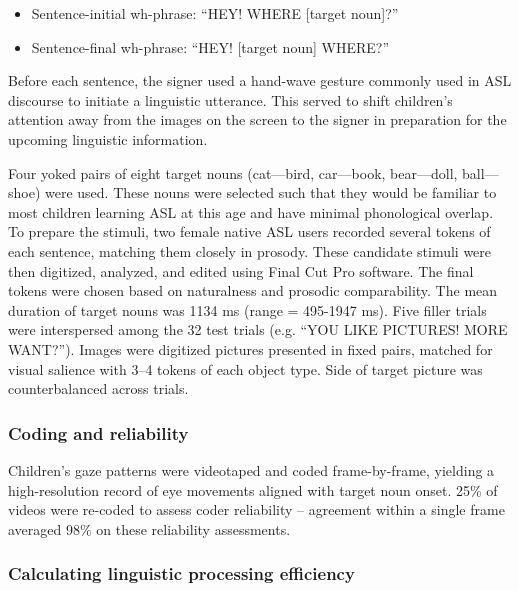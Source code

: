 \documentclass[12pt,]{article}
\begin{document}
\begin{itemize}
\itemsep1pt\parskip0pt
\item
  Sentence-initial wh-phrase: ``HEY! WHERE {[}target noun{]}?''
\item
  Sentence-final wh-phrase: ``HEY! {[}target noun{]} WHERE?''
\end{itemize}

Before each sentence, the signer used a hand-wave gesture commonly used
in ASL discourse to initiate a linguistic utterance. This served to
shift children's attention away from the images on the screen to the
signer in preparation for the upcoming linguistic information.

Four yoked pairs of eight target nouns (cat---bird, car---book,
bear---doll, ball---shoe) were used. These nouns were selected such that
they would be familiar to most children learning ASL at this age and
have minimal phonological overlap. To prepare the stimuli, two female
native ASL users recorded several tokens of each sentence, matching them
closely in prosody. These candidate stimuli were then digitized,
analyzed, and edited using Final Cut Pro software. The final tokens were
chosen based on naturalness and prosodic comparability. The mean
duration of target nouns was 1134 ms (range = 495-1947 ms). Five filler
trials were interspersed among the 32 test trials (e.g. ``YOU LIKE
PICTURES! MORE WANT?''). Images were digitized pictures presented in
fixed pairs, matched for visual salience with 3--4 tokens of each object
type. Side of target picture was counterbalanced across trials.

\subsubsection{Coding and reliability}\label{coding-and-reliability}

Children's gaze patterns were videotaped and coded frame-by-frame,
yielding a high-resolution record of eye movements aligned with target
noun onset. 25\% of videos were re-coded to assess coder reliability --
agreement within a single frame averaged 98\% on these reliability
assessments.

\subsubsection{Calculating linguistic processing
efficiency}\label{calculating-linguistic-processing-efficiency}
\end{document}
